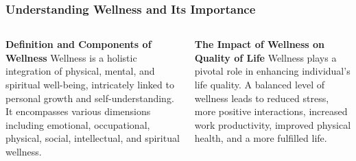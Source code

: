 \documentclass[5pt]{beamer}
\begin{document}
\begin{frame}
\frametitle{Understanding Wellness and Its Importance}
\begin{columns}
\begin{column}{0.45\textwidth}
\begin{block}{\textbf{Definition and Components of Wellness}}
Wellness is a holistic integration of physical, mental, and spiritual well-being, intricately linked to personal growth and self-understanding. It encompasses various dimensions including emotional, occupational, physical, social, intellectual, and spiritual wellness.
\end{block}
\end{column}
\begin{column}{0.45\textwidth}
\begin{block}{\textbf{The Impact of Wellness on Quality of Life}}
Wellness plays a pivotal role in enhancing individual's life quality. A balanced level of wellness leads to reduced stress, more positive interactions, increased work productivity, improved physical health, and a more fulfilled life.
\end{block}
\end{column}
\end{columns}
\end{frame}
\end{document}

